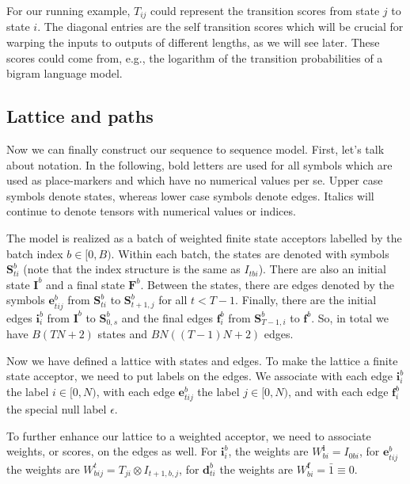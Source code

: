 \documentclass[a4paper]{article}
\begin{document}
For our running example, $T_{ij}$ could represent the transition scores from state $j$ to state $i$. The diagonal entries are the self transition scores which will be crucial for warping the inputs to outputs of different lengths, as we will see later. These scores could come from, e.g., the logarithm of the transition probabilities of a bigram language model.

\subsection{Lattice and paths}

Now we can finally construct our sequence to sequence model. First, let's talk about notation. In the following, bold letters are used for all symbols which are used as place-markers and which have no numerical values per se. Upper case symbols denote states, whereas lower case symbols denote edges. Italics will continue to denote tensors with numerical values or indices.

The model is realized as a batch of weighted finite state acceptors labelled by the batch index $b\in [0, B)$. Within each batch, the states are denoted with symbols $\mathbf{S}^{b}_{ti}$ (note that the index structure is the same as $I_{tbi}$). There are also an initial state $\mathbf{I}^b$ and a final state $\mathbf{F}^b$. Between the states, there are edges denoted by the symbols $\mathbf{e}^b_{tij}$ from $\mathbf{S}^b_{ti}$ to $\mathbf{S}^b_{t+1,j}$ for all $t<T-1$. Finally, there are the initial edges $\mathbf{i}^b_{i}$ from $\mathbf{I}^b$ to $\mathbf{S}^b_{0,s}$ and the final edges $\mathbf{f}^b_{i}$ from $\mathbf{S}^b_{T-1,i}$ to $\mathbf{f}^b$. So, in total we have $B(TN+2)$ states and $BN((T-1)N+2)$ edges.

Now we have defined a lattice with states and edges. To make the lattice a finite state acceptor, we need to put labels on the edges. We associate with each edge $\mathbf{i}^b_{i}$ the label $i\in [0, N)$, with each edge $\mathbf{e}^b_{tij}$ the label $j \in [0, N)$, and with each edge $\mathbf{f}^b_i$ the special null label $\epsilon$.

To further enhance our lattice to a weighted acceptor, we need to associate weights, or scores, on the edges as well. For $\mathbf{i}^b_{i}$, the weights are $W^{\mathbf{i}}_{bi} = I_{0bi}$, for $\mathbf{e}^b_{tij}$ the weights are $W^{t}_{bij} = T_{ji} \otimes I_{t+1, b, j}$, for $\mathbf{d}^b_{ti}$ the weights are $W^{\mathbf{f}}_{bi}=\bar{1}\equiv 0$.
\end{document}
